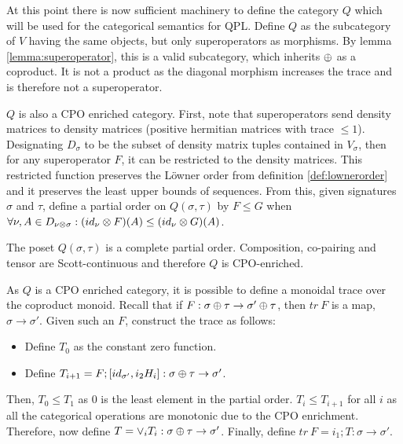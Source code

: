 At this point there is now sufficient machinery to define the category $Q$ which will be used for
the categorical semantics for QPL. Define $Q$ as the subcategory of $V$ having the same objects,
but only superoperators as morphisms. By lemma \ref{lemma:superoperator}, this is a valid
subcategory, which inherits $\oplus$ as a coproduct. It is not a product as the diagonal morphism
increases the trace and is therefore not a superoperator.

$Q$ is also a CPO enriched category. First, note that superoperators send density matrices to
density matrices (positive hermitian matrices with trace $\le 1$). Designating $D_{\sigma}$ to be
the subset of density matrix tuples contained in $V_{\sigma}$, then for any superoperator $F$, it
can be restricted to the density matrices. This restricted function preserves the L\"owner order
from definition \ref{def:lownerorder} and it preserves the least upper bounds of sequences. From
this, given signatures $\sigma$ and $\tau$, define a partial order on $Q(\sigma,\tau)$ by $F\le G$
when $\forall \nu, A\in D_{\nu\otimes\sigma}: (id_{\nu} \otimes F)(A) \le (id_{\nu} \otimes G)(A)$.

\begin{lemma}\label{lemma:qiscpoenriched}
The poset $Q(\sigma,\tau)$ is a complete partial order. Composition, co-pairing and tensor are
Scott-continuous and therefore $Q$ is CPO-enriched.
\end{lemma}

As $Q$ is a CPO enriched category, it is possible to define a monoidal trace over the coproduct
monoid. Recall that if $F:\sigma \oplus \tau \to \sigma' \oplus \tau$, then $tr\ F$ is a map, $\sigma \to
\sigma'$. Given such an $F$, construct the trace as follows:
\begin{itemize}
  \item Define $T_{0}$ as the constant zero function.
  \item Define $T_{i+1} = F ; [id_{\sigma'},i_{2} H_{i}]: \sigma\oplus \tau \to \sigma'$.
\end{itemize}
Then, $T_{0}\le T_{1}$ as 0 is the least element in the partial order. $T_{i}\le T_{i+1}$ for all
$i$ as all the categorical operations are monotonic due to the CPO enrichment. Therefore, now
define $T = \vee_{i} T_{i}:\sigma\oplus \tau \to \sigma'$. Finally, define $tr\ F = i_{1}; T: \sigma
\to \sigma'$.

